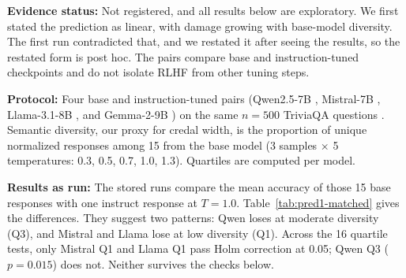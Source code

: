 \textbf{Evidence status:} Not registered, and all results below are exploratory. We first stated the prediction as linear, with damage growing with base-model diversity. The first run contradicted that, and we restated it after seeing the results, so the restated form is post hoc. The pairs compare base and instruction-tuned checkpoints and do not isolate RLHF from other tuning steps.

\textbf{Protocol:} Four base and instruction-tuned pairs (Qwen2.5-7B \citep{qwen2024}, Mistral-7B \citep{jiang2023}, Llama-3.1-8B \citep{dubey2024}, and Gemma-2-9B \citep{gemma2024}) on the same $n=500$ TriviaQA questions \citep{joshi2017}. Semantic diversity, our proxy for credal width, is the proportion of unique normalized responses among 15 from the base model (3 samples $\times$ 5 temperatures: 0.3, 0.5, 0.7, 1.0, 1.3). Quartiles are computed per model.

\textbf{Results as run:} The stored runs compare the mean accuracy of those 15 base responses with one instruct response at $T=1.0$. Table~\ref{tab:pred1-matched} gives the differences. They suggest two patterns: Qwen loses at moderate diversity (Q3), and Mistral and Llama lose at low diversity (Q1). Across the 16 quartile tests, only Mistral Q1 and Llama Q1 pass Holm correction at 0.05; Qwen Q3 ($p=0.015$) does not. Neither survives the checks below.

